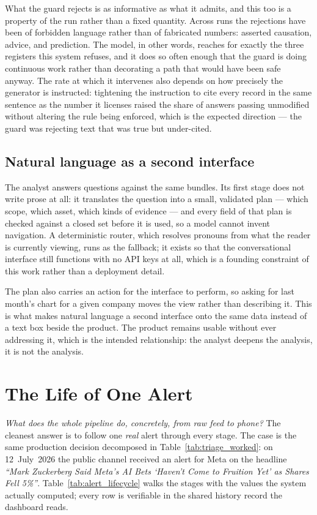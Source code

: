 What the guard rejects is as informative as what it admits, and this too is a property of the run
rather than a fixed quantity. Across runs the rejections have been of forbidden language rather
than of fabricated numbers: asserted causation, advice, and prediction. The model, in other words,
reaches for exactly the three registers this system refuses, and it does so often enough that the
guard is doing continuous work rather than decorating a path that would have been safe anyway. The
rate at which it intervenes also depends on how precisely the generator is instructed: tightening
the instruction to cite every record in the same sentence as the number it licenses raised the
share of answers passing unmodified without altering the rule being enforced, which is the expected
direction --- the guard was rejecting text that was true but under-cited.

\subsection{Natural language as a second interface}

The analyst answers questions against the same bundles. Its first stage does not write prose at all:
it translates the question into a small, validated plan --- which scope, which asset, which kinds of
evidence --- and every field of that plan is checked against a closed set before it is used, so a
model cannot invent navigation. A deterministic router, which resolves pronouns from what the reader
is currently viewing, runs as the fallback; it exists so that the conversational interface still
functions with no API keys at all, which is a founding constraint of this work rather than a
deployment detail.

The plan also carries an action for the interface to perform, so asking for last month's chart for a
given company moves the view rather than describing it. This is what makes natural language a second
interface onto the same data instead of a text box beside the product. The product remains usable
without ever addressing it, which is the intended relationship: the analyst deepens the analysis, it
is not the analysis.

\section{The Life of One Alert}
\label{sec:investigator_lifecycle}

\emph{What does the whole pipeline do, concretely, from raw feed to phone?} The cleanest answer is to
follow one \emph{real} alert through every stage. The case is the same production decision decomposed in
Table~\ref{tab:triage_worked}: on 12~July~2026 the public channel received an alert for Meta on the
headline \emph{``Mark Zuckerberg Said Meta's AI Bets `Haven't Come to Fruition Yet' as Shares Fell
5\%''}. Table~\ref{tab:alert_lifecycle} walks the stages with the values the system actually computed;
every row is verifiable in the shared history record the dashboard reads.

